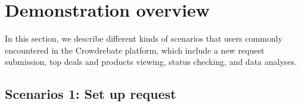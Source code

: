 \section{Demonstration overview}

In this section, we describe different kinds of scenarios that users commonly encountered in the Crowdrebate platform, which include a new request submission, top deals and products viewing, status checking, and data analyses.

\subsection{Scenarios 1: Set up request}

\begin{figure}[t!] \vspace{-1ex}
\end{figure}
